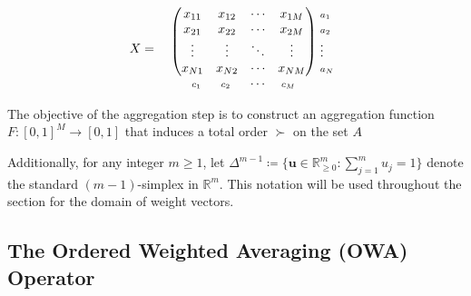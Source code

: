 \[\mathbf{X}=
	\setlength{\arraycolsep}{5pt} %
	\begin{array}{c@{\,}l}
		\begin{array}{c}
			\begin{pmatrix}
					x_{11} & x_{12} & \cdots & x_{1M} \\
					x_{21} & x_{22} & \cdots & x_{2M} \\
					\vdots & \vdots & \ddots & \vdots \\
					x_{N1} & x_{N2} & \cdots & x_{NM}
			\end{pmatrix} \\[2mm] %
			\begin{array}{llll}
					\scriptstyle c_1 \hspace{1mm} & \hspace{1mm}\scriptstyle c_2 \hspace{1mm} & \hspace{1mm}\cdots & \hspace{1mm}\scriptstyle c_M
			\end{array}
		\end{array}
		\hspace{-2.5mm}
		\begin{array}{l}
			\scriptstyle a_1    \\%
			\scriptstyle a_2    \\%
			\scriptstyle \vdots \\%
			\scriptstyle a_N    \\
			\\
		\end{array}
	\end{array}
\]

The objective of the aggregation step is to construct an aggregation function $F: [0,1]^M \to [0,1]$ that induces a total order $\succ$ on the set $A$

Additionally, for any integer $m\ge 1$, let
$\Delta^{m-1}\coloneqq\{\mathbf{u}\in\mathbb{R}_{\ge 0}^m:\sum_{j=1}^m u_j=1\}$ denote the standard $(m-1)$-simplex in $\mathbb{R}^m$. This notation will be used throughout the section for the domain of weight vectors.

\subsection{The Ordered Weighted Averaging (OWA) Operator}

